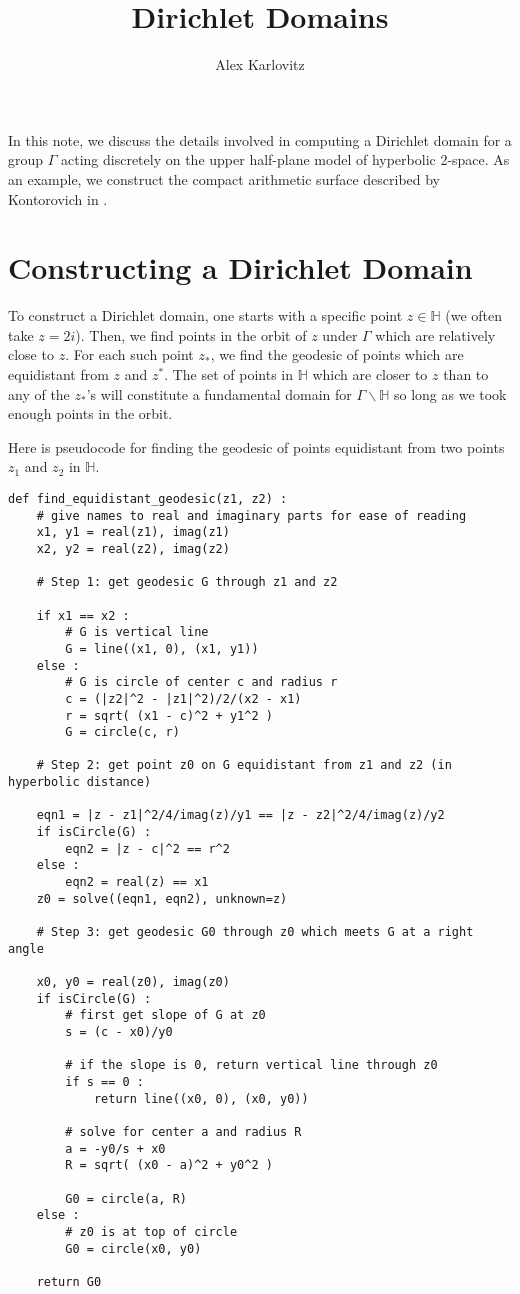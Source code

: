 \documentclass[]{article}
\title{Dirichlet Domains}
\author{Alex Karlovitz}
\date{}
\begin{document}
	
	\maketitle
	
In this note, we discuss the details involved in computing a Dirichlet domain for a group $\Gamma$ acting discretely on the upper half-plane model of hyperbolic 2-space.
As an example, we construct the compact arithmetic surface described by Kontorovich in \cite{kontorovich2011}.
	
\section*{Constructing a Dirichlet Domain}
	
To construct a Dirichlet domain, one starts with a specific point $z \in \mathbb{H}$ (we often take $z = 2i$).
Then, we find points in the orbit of $z$ under $\Gamma$ which are relatively close to $z$.
For each such point $z_*$, we find the geodesic of points which are equidistant from $z$ and $z^*$.
The set of points in $\mathbb{H}$ which are closer to $z$ than to any of the $z_*$'s will constitute a fundamental domain for $\Gamma\backslash\mathbb{H}$ so long as we took enough points in the orbit.

Here is pseudocode for finding the geodesic of points equidistant from two points $z_1$ and $z_2$ in $\mathbb{H}$.
\begin{verbatim}
def find_equidistant_geodesic(z1, z2) :
    # give names to real and imaginary parts for ease of reading
    x1, y1 = real(z1), imag(z1)
    x2, y2 = real(z2), imag(z2)

    # Step 1: get geodesic G through z1 and z2
    
    if x1 == x2 :
        # G is vertical line
        G = line((x1, 0), (x1, y1))
    else :
        # G is circle of center c and radius r
        c = (|z2|^2 - |z1|^2)/2/(x2 - x1)
        r = sqrt( (x1 - c)^2 + y1^2 )
        G = circle(c, r)
        
    # Step 2: get point z0 on G equidistant from z1 and z2 (in hyperbolic distance)
    
    eqn1 = |z - z1|^2/4/imag(z)/y1 == |z - z2|^2/4/imag(z)/y2
    if isCircle(G) :
        eqn2 = |z - c|^2 == r^2
    else :
        eqn2 = real(z) == x1
    z0 = solve((eqn1, eqn2), unknown=z)
    
    # Step 3: get geodesic G0 through z0 which meets G at a right angle
    
    x0, y0 = real(z0), imag(z0)
    if isCircle(G) :
        # first get slope of G at z0
        s = (c - x0)/y0
        
        # if the slope is 0, return vertical line through z0
        if s == 0 :
            return line((x0, 0), (x0, y0))
        
        # solve for center a and radius R
        a = -y0/s + x0
        R = sqrt( (x0 - a)^2 + y0^2 )
        
        G0 = circle(a, R)
    else :
        # z0 is at top of circle
        G0 = circle(x0, y0)
        
    return G0
\end{verbatim}
	
	\pagebreak
	
	\printbibliography
	
\end{document}
